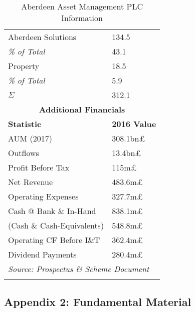 \documentclass[11pt, english]{article}
\begin{document}
\begin{center}
\begin{longtable}{p{5cm}p{6cm}}
	Aberdeen Solutions & 134.5\\
	\textit{\% of Total} & 43.1\\
	Property & 18.5\\
	\textit{\% of Total} & 5.9\\
	\hline
	$\Sigma$ & 312.1\\
	\hline
	\hline        
        \hline                                
        \multicolumn{2}{c}{\textbf{Additional Financials}}\\ 
        \hline
        \hline
	\textbf{Statistic} & \textbf{2016 Value}\\
	\hline
	AUM (2017) & 308.1bn\pounds\\
	Outflows & 13.4bn\pounds\\
	Profit Before Tax & 115m\pounds\\
	Net Revenue & 483.6m\pounds\\
	Operating Expenses & 327.7m\pounds\\
	Cash @ Bank \& In-Hand & 838.1m\pounds\\
	(Cash \& Cash-Equivalents) & 548.8m\pounds\\
	Operating CF Before I\&T & 362.4m\pounds\\
	Dividend Payments & 280.4m\pounds\\
	\hline
        \multicolumn{2}{l}{\textit{Source: Prospectus \& Scheme Document}}\\
        \hline
	\caption{Aberdeen Asset Management PLC Information}
\end{longtable}
\end{center}

	\subsection*{Appendix 2: Fundamental Material}
\end{document}
